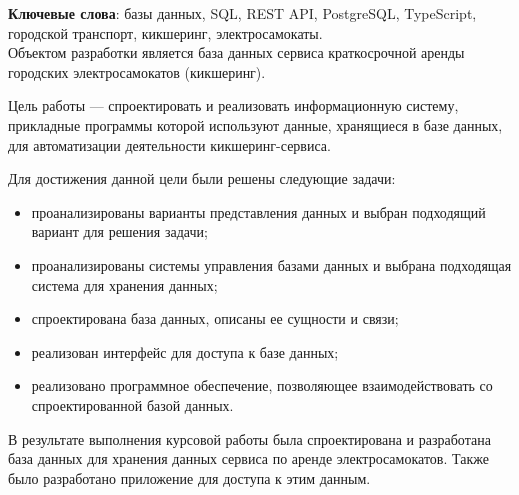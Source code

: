 \begin{essay}{}
	\noindent\textbf{Ключевые слова}: базы данных, SQL, REST API, PostgreSQL, TypeScript, городской транспорт, кикшеринг, электросамокаты.\\

	Объектом разработки является база данных сервиса краткосрочной аренды городских электросамокатов (кикшеринг).

	Цель работы --- спроектировать и реализовать информационную систему, прикладные программы которой используют данные, хранящиеся в базе данных, для автоматизации деятельности кикшеринг-сервиса.

	Для достижения данной цели были решены следующие задачи:

	\begin{itemize}
		\item проанализированы варианты представления данных и выбран подходящий вариант для решения задачи;
		\item проанализированы системы управления базами данных и выбрана подходящая система для хранения данных;
		\item спроектирована база данных, описаны ее сущности и связи;
		\item реализован интерфейс для доступа к базе данных;
		\item реализовано программное обеспечение, позволяющее взаимодействовать со спроектированной базой данных.
	\end{itemize}

	В результате выполнения курсовой работы была спроектирована и разработана база данных для хранения данных сервиса по аренде электросамокатов. Также было разработано приложение для доступа к этим данным.
\end{essay}